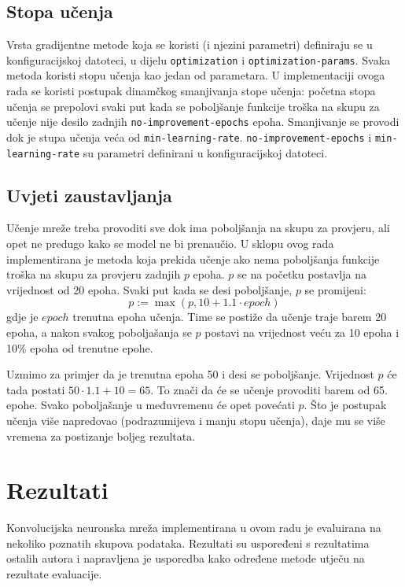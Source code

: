 \documentclass[times, utf8, diplomski, numeric]{fer}
\begin{document}
\section{Stopa učenja}

Vrsta gradijentne metode koja se koristi (i njezini parametri) definiraju se u konfiguracijskoj datoteci, u dijelu \texttt{optimization} i \texttt{optimization-params}. Svaka metoda koristi stopu učenja kao jedan od parametara. U implementaciji ovoga rada se koristi postupak dinamčkog smanjivanja stope učenja: početna stopa učenja se prepolovi svaki put kada se poboljšanje funkcije troška na skupu za učenje  nije desilo zadnjih \texttt{no-improvement-epochs} epoha. Smanjivanje se provodi dok je stupa učenja veća od \texttt{min-learning-rate}. \texttt{no-improvement-epochs} i \texttt{min-learning-rate} su parametri definirani u konfiguracijskoj datoteci.

\section{Uvjeti zaustavljanja}
Učenje mreže treba provoditi sve dok ima poboljšanja na skupu za provjeru, ali opet ne predugo kako se model ne bi prenaučio. U sklopu ovog rada implementirana je metoda koja prekida učenje ako nema poboljšanja funkcije troška na skupu za provjeru  zadnjih $p$ epoha. $p$ se na početku postavlja na vrijednost od 20 epoha. Svaki put kada se desi poboljšanje, $p$ se promijeni:
\begin{equation}
  p := \max \left( p, 10 + 1.1 \cdot epoch \right)
\end{equation}
gdje je $epoch$ trenutna epoha učenja. Time se postiže da učenje traje barem 20 epoha, a nakon svakog poboljašanja se $p$ postavi na vrijednost veću za 10 epoha i 10\% epoha od trenutne epohe.

Uzmimo za primjer da je trenutna epoha 50 i desi se poboljšanje. Vrijednost $p$ će tada postati $50 \cdot 1.1 + 10 = 65$. To znači da će se učenje provoditi barem od 65. epohe. Svako poboljašanje u međuvremenu će opet povećati $p$. Što je postupak učenja više napredovao (podrazumijeva i manju stopu učenja), daje mu se više vremena za postizanje boljeg rezultata.


\chapter{Rezultati}

Konvolucijska neuronska mreža implementirana u ovom radu je evaluirana na nekoliko poznatih skupova podataka. Rezultati su uspoređeni s rezultatima ostalih autora i napravljena je usporedba kako određene metode utječu na rezultate evaluacije.
\end{document}
